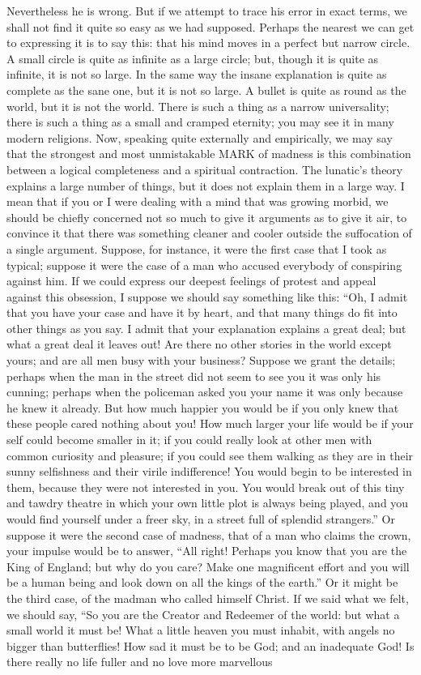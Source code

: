 Nevertheless he is wrong. But if we attempt to trace his error in exact terms, we shall not find it quite so easy as we had supposed. Perhaps the nearest we can get to expressing it is to say this: that his mind moves in a perfect but narrow circle. A small circle is quite as infinite as a large circle; but, though it is quite as infinite, it is not so large. In the same way the insane explanation is quite as complete as the sane one, but it is not so large. A bullet is quite as round as the world, but it is not the world. There is such a thing as a narrow universality; there is such a thing as a small and cramped eternity; you may see it in many modern religions. Now, speaking quite externally and empirically, we may say that the strongest and most unmistakable MARK of madness is this combination between a logical completeness and a spiritual contraction. The lunatic’s theory explains a large number of things, but it does not explain them in a large way. I mean that if you or I were dealing with a mind that was growing morbid, we should be chiefly concerned not so much to give it arguments as to give it air, to convince it that there was something cleaner and cooler outside the suffocation of a single argument. Suppose, for instance, it were the first case that I took as typical; suppose it were the case of a man who accused everybody of conspiring against him. If we could express our deepest feelings of protest and appeal against this obsession, I suppose we should say something like this: “Oh, I admit that you have your case and have it by heart, and that many things do fit into other things as you say. I admit that your explanation explains a great deal; but what a great deal it leaves out! Are there no other stories in the world except yours; and are all men busy with your business? Suppose we grant the details; perhaps when the man in the street did not seem to see you it was only his cunning; perhaps when the policeman asked you your name it was only because he knew it already. But how much happier you would be if you only knew that these people cared nothing about you! How much larger your life would be if your self could become smaller in it; if you could really look at other men with common curiosity and pleasure; if you could see them walking as they are in their sunny selfishness and their virile indifference! You would begin to be interested in them, because they were not interested in you. You would break out of this tiny and tawdry theatre in which your own little plot is always being played, and you would find yourself under a freer sky, in a street full of splendid strangers.” Or suppose it were the second case of madness, that of a man who claims the crown, your impulse would be to answer, “All right! Perhaps you know that you are the King of England; but why do you care? Make one magnificent effort and you will be a human being and look down on all the kings of the earth.” Or it might be the third case, of the madman who called himself Christ. If we said what we felt, we should say, “So you are the Creator and Redeemer of the world: but what a small world it must be! What a little heaven you must inhabit, with angels no bigger than butterflies! How sad it must be to be God; and an inadequate God! Is there really no life fuller and no love more marvellous 
